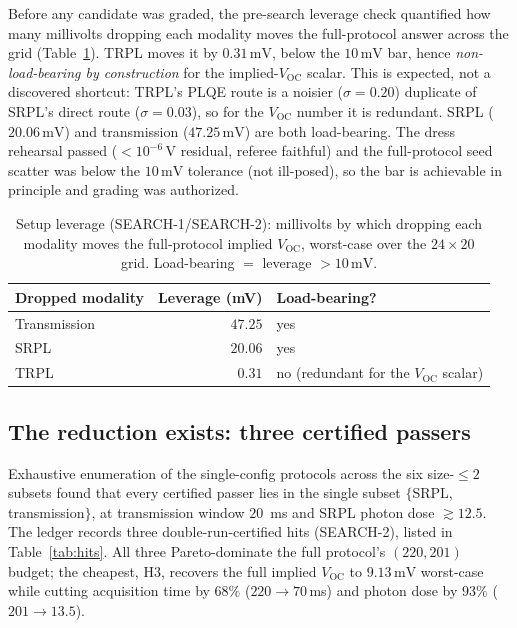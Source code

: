 \documentclass[11pt]{article}
\newcommand{\Voc}{V_{\mathrm{OC}}}
\newcommand{\mV}{\,\mathrm{mV}}
\begin{document}
Before any candidate was graded, the pre-search leverage check quantified how many millivolts dropping each modality moves the full-protocol answer across the grid (Table~\ref{tab:leverage}). TRPL moves it by $0.31\mV$, below the $10\mV$ bar, hence \emph{non-load-bearing by construction} for the implied-$\Voc$ scalar. This is expected, not a discovered shortcut: TRPL's PLQE route is a noisier ($\sigma=0.20$) duplicate of SRPL's direct route ($\sigma=0.03$), so for the $\Voc$ number it is redundant. SRPL ($20.06\mV$) and transmission ($47.25\mV$) are both load-bearing. The dress rehearsal passed ($<10^{-6}\,\mathrm{V}$ residual, referee faithful) and the full-protocol seed scatter was below the $10\mV$ tolerance (not ill-posed), so the bar is achievable in principle and grading was authorized.

\begin{table}[t]
\centering
\caption{Setup leverage (SEARCH-1/SEARCH-2): millivolts by which dropping each modality moves the full-protocol implied $\Voc$, worst-case over the $24\times20$ grid. Load-bearing $=$ leverage $>10\mV$.}
\label{tab:leverage}
\begin{tabular}{lrl}
\toprule
Dropped modality & Leverage (mV) & Load-bearing? \\
\midrule
Transmission & $47.25$ & yes \\
SRPL         & $20.06$ & yes \\
TRPL         & $0.31$  & no (redundant for the $\Voc$ scalar) \\
\bottomrule
\end{tabular}
\end{table}

\subsection{The reduction exists: three certified passers}

Exhaustive enumeration of the single-config protocols across the six size-$\le 2$ subsets found that every certified passer lies in the single subset $\{$SRPL, transmission$\}$, at transmission window $20$~ms and SRPL photon dose $\gtrsim 12.5$. The ledger records three double-run-certified hits (SEARCH-2), listed in Table~\ref{tab:hits}. All three Pareto-dominate the full protocol's $(220,201)$ budget; the cheapest, H3, recovers the full implied $\Voc$ to $9.13\mV$ worst-case while cutting acquisition time by $68\%$ ($220\to70\,$ms) and photon dose by $93\%$ ($201\to13.5$).
\end{document}
